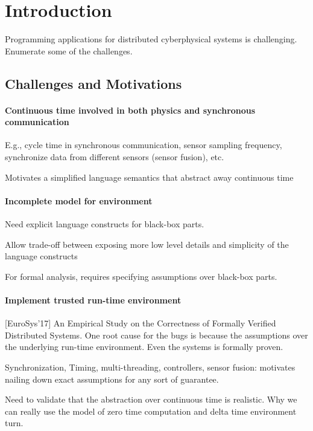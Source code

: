 \section{Introduction}
\label{sec:intro}

Programming applications for distributed cyberphysical systems is challenging.
Enumerate some of the challenges.

\subsection{Challenges and Motivations~}

\paragraph{Continuous time involved in both physics and synchronous communication}
E.g., cycle time in synchronous communication, sensor sampling frequency, synchronize data from different sensors (sensor fusion), etc.

Motivates a simplified language semantics that abstract away continuous time


\paragraph{Incomplete model for environment}

Need explicit language constructs for black-box parts.

Allow trade-off between exposing more low level details and simplicity of the language constructs

For formal analysis, requires specifying assumptions over black-box parts.


\paragraph{Implement trusted run-time environment}


[EuroSys'17] An Empirical Study on the Correctness of Formally Verified Distributed Systems.
One root cause for the bugs is because the assumptions over the underlying run-time environment. Even the systems is formally proven.

Synchronization, Timing, multi-threading, controllers, sensor fusion:
motivates nailing down exact assumptions for any sort of guarantee.

Need to validate that the abstraction over continuous time is realistic.
Why we can really use the model of zero time computation and delta time environment turn.

